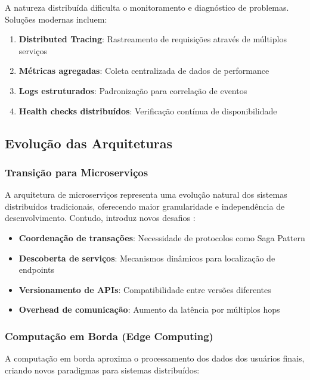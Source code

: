 A natureza distribuída dificulta o monitoramento e diagnóstico de problemas. Soluções modernas incluem:

\begin{enumerate}
    \item \textbf{Distributed Tracing}: Rastreamento de requisições através de múltiplos serviços
    \item \textbf{Métricas agregadas}: Coleta centralizada de dados de performance
    \item \textbf{Logs estruturados}: Padronização para correlação de eventos
    \item \textbf{Health checks distribuídos}: Verificação contínua de disponibilidade
\end{enumerate}

\subsection{Evolução das Arquiteturas}

\subsubsection{Transição para Microserviços}

A arquitetura de microserviços representa uma evolução natural dos sistemas distribuídos tradicionais, oferecendo maior granularidade e independência de desenvolvimento. Contudo, introduz novos desafios \cite{tanenbaum2016sistemas}:

\begin{itemize}
    \item \textbf{Coordenação de transações}: Necessidade de protocolos como Saga Pattern
    \item \textbf{Descoberta de serviços}: Mecanismos dinâmicos para localização de endpoints
    \item \textbf{Versionamento de APIs}: Compatibilidade entre versões diferentes
    \item \textbf{Overhead de comunicação}: Aumento da latência por múltiplos hops
\end{itemize}

\subsubsection{Computação em Borda (Edge Computing)}

A computação em borda aproxima o processamento dos dados dos usuários finais, criando novos paradigmas para sistemas distribuídos:

